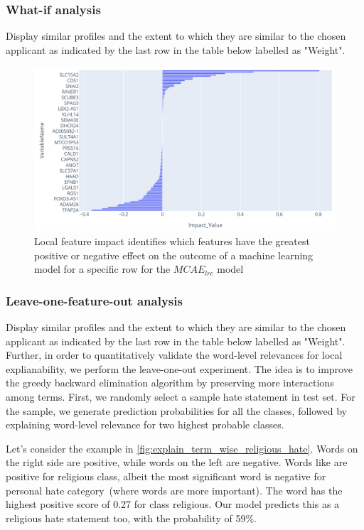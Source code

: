 \subsubsection{What-if analysis}
Display similar profiles and the extent to which they are similar to the chosen applicant as indicated by the last row in the table below labelled as "Weight". 

\begin{figure}[h]
    \centering
	\includegraphics[scale=0.8]{images/local_fi_1.png}
	\caption{Local feature impact identifies which features have the greatest positive or negative effect on the outcome of a machine learning model for a specific row for the $MCAE_{lrc}$ model}
    \label{fig:local_feature_impacts2}
\end{figure}

\subsubsection{Leave-one-feature-out analysis}
Display similar profiles and the extent to which they are similar to the chosen applicant as indicated by the last row in the table below labelled as "Weight". Further, in order to quantitatively validate the word-level relevances for local explianability, we perform the leave-one-out experiment. The idea is to improve the greedy backward elimination algorithm by preserving more interactions among terms. First, we randomly select a sample hate statement in test set. For the sample, we generate prediction probabilities for all the classes, followed by explaining word-level relevance for two highest probable classes. 

Let's consider the example in 
\cref{fig:explain_term_wise_religious_hate}. Words on the right 
side are positive, while words on the left are negative. Words like %
are positive for religious class, albeit the most significant word %
is negative for personal hate category~(where words
are more important). The word %
has the highest positive score of 0.27 for class religious. Our model predicts this as a religious hate statement too, with the probability of 59\%. 

